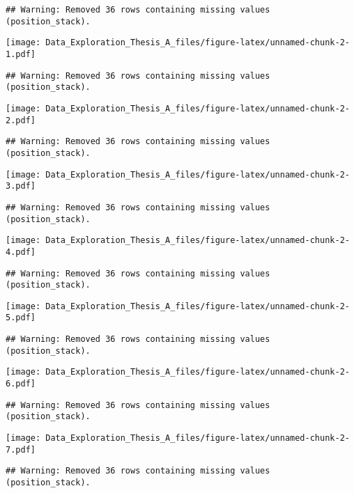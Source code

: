\documentclass[]{article}
\begin{document}
\begin{verbatim}
## Warning: Removed 36 rows containing missing values (position_stack).
\end{verbatim}

\texttt{[image: Data\_Exploration\_Thesis\_A\_files/figure-latex/unnamed-chunk-2-1.pdf]}

\begin{verbatim}
## Warning: Removed 36 rows containing missing values (position_stack).
\end{verbatim}

\texttt{[image: Data\_Exploration\_Thesis\_A\_files/figure-latex/unnamed-chunk-2-2.pdf]}

\begin{verbatim}
## Warning: Removed 36 rows containing missing values (position_stack).
\end{verbatim}

\texttt{[image: Data\_Exploration\_Thesis\_A\_files/figure-latex/unnamed-chunk-2-3.pdf]}

\begin{verbatim}
## Warning: Removed 36 rows containing missing values (position_stack).
\end{verbatim}

\texttt{[image: Data\_Exploration\_Thesis\_A\_files/figure-latex/unnamed-chunk-2-4.pdf]}

\begin{verbatim}
## Warning: Removed 36 rows containing missing values (position_stack).
\end{verbatim}

\texttt{[image: Data\_Exploration\_Thesis\_A\_files/figure-latex/unnamed-chunk-2-5.pdf]}

\begin{verbatim}
## Warning: Removed 36 rows containing missing values (position_stack).
\end{verbatim}

\texttt{[image: Data\_Exploration\_Thesis\_A\_files/figure-latex/unnamed-chunk-2-6.pdf]}

\begin{verbatim}
## Warning: Removed 36 rows containing missing values (position_stack).
\end{verbatim}

\texttt{[image: Data\_Exploration\_Thesis\_A\_files/figure-latex/unnamed-chunk-2-7.pdf]}

\begin{verbatim}
## Warning: Removed 36 rows containing missing values (position_stack).
\end{verbatim}
\end{document}
